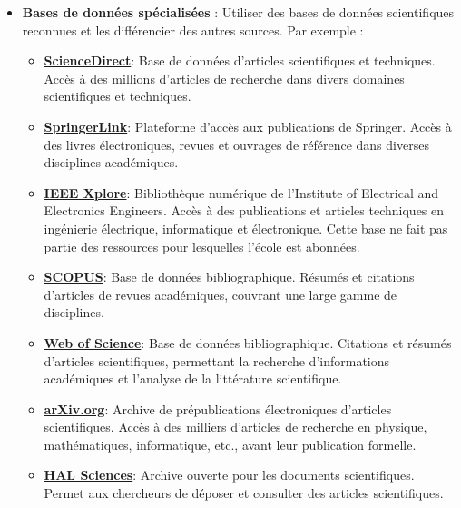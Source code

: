 \documentclass[review]{elsarticle}
\begin{document}
\begin{itemize}
    \item \textbf{Bases de données spécialisées} : Utiliser des bases de données scientifiques reconnues et les différencier des autres sources. Par exemple :

\begin{itemize}

\item \href{https://www.sciencedirect.com/}{\textbf{ScienceDirect}}:  Base de données d'articles scientifiques et techniques. Accès à des millions d'articles de recherche dans divers domaines scientifiques et techniques.

\item \textbf{\href{https://link.springer.com/}{SpringerLink}}: Plateforme d'accès aux publications de Springer. Accès à des livres électroniques, revues et ouvrages de référence dans diverses disciplines académiques.

\item \textbf{\href{https://www.ieee.org/}{IEEE Xplore}}: Bibliothèque numérique de l'Institute of Electrical and Electronics Engineers. Accès à des publications et articles techniques en ingénierie électrique, informatique et électronique. Cette base ne fait pas partie des ressources pour lesquelles l'école est abonnées.

\item \textbf{\href{https://www.scopus.com/search/form.uri?display=basic/#basic}{SCOPUS}}: Base de données bibliographique. Résumés et citations d'articles de revues académiques, couvrant une large gamme de disciplines.

\item \textbf{\href{https://www.webofscience.com/wos/woscc/basic-search}{Web of Science}}: Base de données bibliographique. Citations et résumés d'articles scientifiques, permettant la recherche d'informations académiques et l'analyse de la littérature scientifique.

\item \href{https://arxiv.org/}{\textbf{arXiv.org}}: Archive de prépublications électroniques d'articles scientifiques. Accès à des milliers d'articles de recherche en physique, mathématiques, informatique, etc., avant leur publication formelle.

\item \textbf{\href{https://hal.science/}{HAL Sciences}}: Archive ouverte pour les documents scientifiques. Permet aux chercheurs de déposer et consulter des articles scientifiques.


\end{itemize}
\end{itemize}
\end{document}
